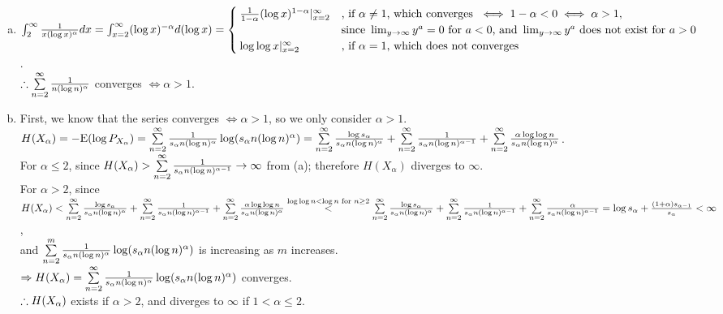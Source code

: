 \begin{pr}$ $
\begin{enumerate}[(a)]
\item $\int_2^\infty\frac1{x(\log x)^\alpha}dx=\int_{x=2}^\infty(\log x)^{-\alpha}d(\log x)\\
=\begin{cases}
\frac1{1-\alpha}(\log x)^{1-\alpha}|_{x=2}^\infty&\text{, if }\alpha\neq1\text{, which converges }\iff1-\alpha<0\iff\alpha>1,\\
&\text{since }\lim_{y\to\infty}y^a=0\text{ for }a<0\text{, and }\lim_{y\to\infty}y^a\text{ does not exist for }a>0\\
\log\log x|_{x=2}^\infty&\text{, if }\alpha=1\text{, which does not converges}
\end{cases}$.\\
$\therefore\sum\limits_{n=2}^\infty\frac1{n(\log n)^\alpha}$ converges $\iff\alpha>1$.
\item First, we know that the series converges $\iff\alpha>1$, so we only consider $\alpha>1$.\\
$H(X_\alpha)=-\mathrm{E}(\log P_{X_\alpha})=\sum\limits_{n=2}^\infty\frac1{s_\alpha n(\log n)^\alpha}\log(s_\alpha n(\log n)^\alpha)=\sum\limits_{n=2}^\infty\frac{\log s_\alpha}{s_\alpha n(\log n)^\alpha}+\sum\limits_{n=2}^\infty\frac1{s_\alpha n(\log n)^{\alpha-1}}+\sum\limits_{n=2}^\infty\frac{\alpha\log\log n}{s_\alpha n(\log n)^\alpha}$.\\
For $\alpha\leq2$, since $H(X_\alpha)>\sum\limits_{n=2}^\infty\frac1{s_\alpha n(\log n)^{\alpha-1}}\to\infty$ from (a); therefore $H(X_\alpha)$ diverges to $\infty$.\\
For $\alpha>2$, since $H(X_\alpha)<\sum\limits_{n=2}^\infty\frac{\log s_\alpha}{s_\alpha n(\log n)^\alpha}+\sum\limits_{n=2}^\infty\frac1{s_\alpha n(\log n)^{\alpha-1}}+\sum\limits_{n=2}^\infty\frac{\alpha\log\log n}{s_\alpha n(\log n)^\alpha}\\
\overset{\log\log n<\log n\text{ for }n\geq2}<\sum\limits_{n=2}^\infty\frac{\log s_\alpha}{s_\alpha n(\log n)^\alpha}+\sum\limits_{n=2}^\infty\frac1{s_\alpha n(\log n)^{\alpha-1}}+\sum\limits_{n=2}^\infty\frac{\alpha}{s_\alpha n(\log n)^{\alpha-1}}\\
=\log s_\alpha+\frac{(1+\alpha)s_{\alpha-1}}{s_\alpha}<\infty$,\\
and $\sum\limits_{n=2}^m\frac1{s_\alpha n(\log n)^\alpha}\log(s_\alpha n(\log n)^\alpha)$ is increasing as $m$ increases.\\
$\Rightarrow H(X_\alpha)=\sum\limits_{n=2}^\infty\frac1{s_\alpha n(\log n)^\alpha}\log(s_\alpha n(\log n)^\alpha)$ converges.\\
$\therefore H(X_\alpha)$ exists if $\alpha>2$, and diverges to $\infty$ if $1<\alpha\leq2$.
\end{enumerate}
\end{pr}
